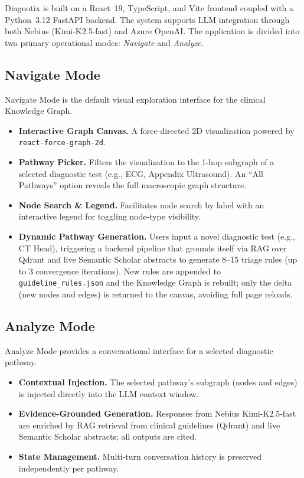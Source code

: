 Diagnotix is built on a React~19, TypeScript, and Vite frontend coupled with a
Python~3.12 FastAPI backend. The system supports LLM integration through both
Nebius (Kimi-K2.5-fast) and Azure OpenAI. The application is divided into two
primary operational modes: \textit{Navigate} and \textit{Analyze}.

\subsection*{Navigate Mode}

Navigate Mode is the default visual exploration interface for the clinical
Knowledge Graph.
\begin{itemize}
    \item \textbf{Interactive Graph Canvas.} A force-directed 2D visualization
    powered by \texttt{react-force-graph-2d}.
    \item \textbf{Pathway Picker.} Filters the visualization to the 1-hop
    subgraph of a selected diagnostic test (e.g., ECG, Appendix Ultrasound). An
    ``All Pathways'' option reveals the full macroscopic graph structure.
    \item \textbf{Node Search \& Legend.} Facilitates node search by label with
    an interactive legend for toggling node-type visibility.
    \item \textbf{Dynamic Pathway Generation.} Users input a novel diagnostic
    test (e.g., CT Head), triggering a backend pipeline that grounds itself via
    RAG over Qdrant and live Semantic Scholar abstracts to generate 8--15 triage
    rules (up to 3 convergence iterations). New rules are appended to
    \texttt{guideline\_rules.json} and the Knowledge Graph is rebuilt; only the
    delta (new nodes and edges) is returned to the canvas, avoiding full page
    reloads.
\end{itemize}

\subsection*{Analyze Mode}

Analyze Mode provides a conversational interface for a selected diagnostic
pathway.
\begin{itemize}
    \item \textbf{Contextual Injection.} The selected pathway's subgraph (nodes
    and edges) is injected directly into the LLM context window.
    \item \textbf{Evidence-Grounded Generation.} Responses from Nebius
    Kimi-K2.5-fast are enriched by RAG retrieval from clinical guidelines
    (Qdrant) and live Semantic Scholar abstracts; all outputs are cited.
    \item \textbf{State Management.} Multi-turn conversation history is
    preserved independently per pathway.
\end{itemize}

